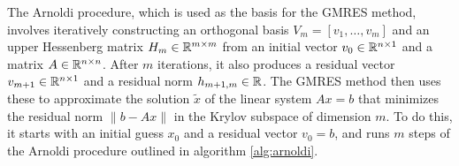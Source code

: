 \noindent The Arnoldi procedure, which is used as the basis for the GMRES method, involves iteratively constructing an orthogonal basis $V_m = [v_1, \dots, v_m]$ and an upper Hessenberg matrix $H_m \in \mathbb{R}^{m\times m}$ from an initial vector $v_0 \in \mathbb{R} ^{n \times 1}$ and a matrix $A \in \mathbb{R}^{n\times n}$. After $m$ iterations, it also produces a residual vector $v_{m+1} \in \mathbb{R}^{n \times 1}$ and a residual norm $h_{m+1,m} \in \mathbb{R}$. The GMRES method then uses these to approximate the solution $\tilde x$ of the linear system $Ax = b$ that minimizes the residual norm $\lVert b - Ax \rVert$ in the Krylov subspace of dimension $m$. To do this, it starts with an initial guess $x_0$ and a residual vector $v_0 = b$, and runs $m$ steps of the Arnoldi procedure outlined in algorithm \ref{alg:arnoldi}. \vspace*{0.4cm}


